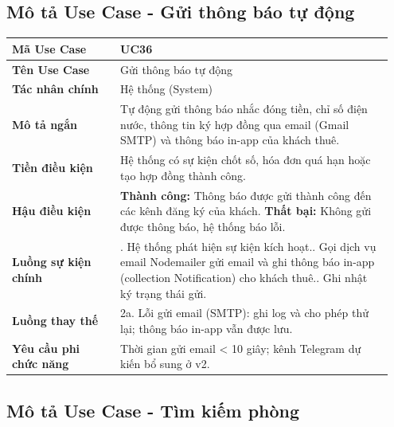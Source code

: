 \documentclass[a4paper,oneside]{report}
\begin{document}
\subsection{Mô tả Use Case - Gửi thông báo tự động}

\begin{longtable}[]{@{}>{\RaggedRight\arraybackslash}p{0.27\linewidth}>{\RaggedRight\arraybackslash}p{0.68\linewidth}@{}}
\toprule
\textbf{Mã Use Case} & UC36\tabularnewline
\midrule
\endhead
\textbf{Tên Use Case} & Gửi thông báo tự động\tabularnewline
\textbf{Tác nhân chính} & Hệ thống (System)\tabularnewline
\textbf{Mô tả ngắn} & Tự động gửi thông báo nhắc đóng tiền, chỉ số điện
nước, thông tin ký hợp đồng qua email (Gmail SMTP) và thông báo in-app
của khách thuê.\tabularnewline
\textbf{Tiền điều kiện} & Hệ thống có sự kiện chốt số, hóa đơn quá hạn
hoặc tạo hợp đồng thành công.\tabularnewline
\textbf{Hậu điều kiện} & \textbf{Thành công:} Thông báo được gửi thành công đến các kênh đăng ký của khách.\newline 
\textbf{Thất bại:} Không gửi được thông báo, hệ thống báo lỗi.\tabularnewline
\textbf{Luồng sự kiện chính} & 1. Hệ thống phát hiện
sự kiện kích hoạt.\newline 2. Gọi dịch vụ email Nodemailer gửi
email và ghi thông báo in-app (collection Notification) cho khách
thuê.\newline 3. Ghi nhật ký trạng thái gửi.\tabularnewline
\textbf{Luồng thay thế} & 2a. Lỗi gửi email (SMTP): ghi log và cho phép
thử lại; thông báo in-app vẫn được lưu.\tabularnewline
\textbf{Yêu cầu phi chức năng} & Thời gian gửi email \textless{} 10
giây; kênh Telegram dự kiến bổ sung ở v2.\tabularnewline
\bottomrule
\end{longtable}

\subsection{Mô tả Use Case - Tìm kiếm phòng}
\end{document}
